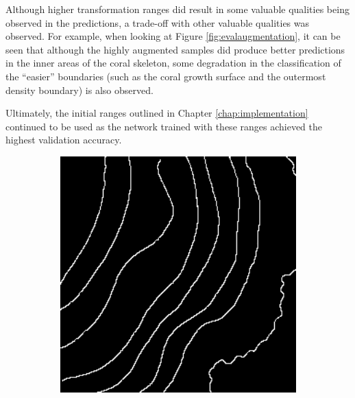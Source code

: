 Although higher transformation ranges did result in some valuable qualities being observed in the predictions, a trade-off with other valuable qualities was observed. For example, when looking at Figure \ref{fig:evalaugmentation}, it can be seen that although the highly augmented samples did produce better predictions in the inner areas of the coral skeleton, some degradation in the classification of the ``easier'' boundaries (such as the coral growth surface and the outermost density boundary) is also observed.

Ultimately, the initial ranges outlined in Chapter \ref{chap:implementation} continued to be used as the network trained with these ranges achieved the highest validation accuracy.

\begin{figure}[!t]
    \centering
    \begin{subfigure}[t]{0.24\textwidth}
        \centering
        \includegraphics[width=1\textwidth, valign=c]{images/lr-comparison.png}
        \caption{}
    \end{subfigure}
    \begin{subfigure}[t]{0.24\textwidth}
        \centering

\end{subfigure}
\end{figure}
